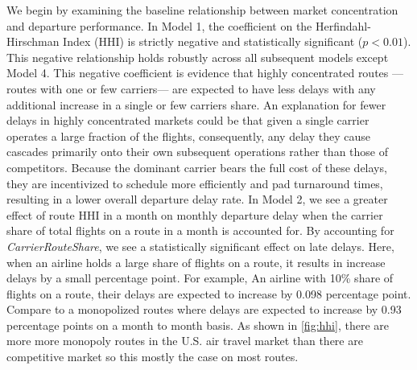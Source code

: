 \documentclass[preprint,12pt,authoryear]{elsarticle}
\begin{document}
We begin by examining the baseline relationship between market concentration and departure performance. In Model 1, the coefficient on the Herfindahl-Hirschman Index (HHI) is strictly negative and statistically significant ($p < 0.01$). This negative relationship holds robustly across all subsequent models except Model 4. This negative coefficient is evidence that highly concentrated routes --- routes with one or few carriers--- are expected to have less delays with any additional increase in a single or few carriers share. An explanation for fewer delays in highly concentrated markets could be that given a single carrier operates a large fraction of the flights, consequently, any delay they cause cascades primarily onto their own subsequent operations rather than those of competitors. Because the dominant carrier bears the full cost of these delays, they are incentivized to schedule more efficiently and pad turnaround times, resulting in a lower overall departure delay rate. In Model 2, we see a greater effect of route HHI in a month on monthly departure delay when the carrier share of total flights on a route in a month is accounted for. By accounting for \textit{CarrierRouteShare}, we see a statistically significant effect on late delays. Here, when an airline holds a large share of flights on a route, it results in increase delays by a small percentage point. For example, An airline with 10\% share of flights on a route, their delays are expected to increase by 0.098 percentage point. Compare to a monopolized routes where delays are expected to increase by 0.93 percentage points on a month to month basis. As shown in \autoref{fig:hhi}, there are more more monopoly routes in the U.S. air travel market than there are competitive market so this mostly the case on most routes. 
\end{document}
